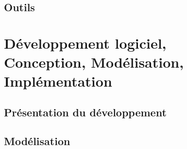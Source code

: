 \documentclass{report}
\begin{document}
\section{Outils} %

\chapter{Développement logiciel, Conception, Modélisation, Implémentation}
\section{Présentation du développement}
\section{Modélisation} %
\end{document}
